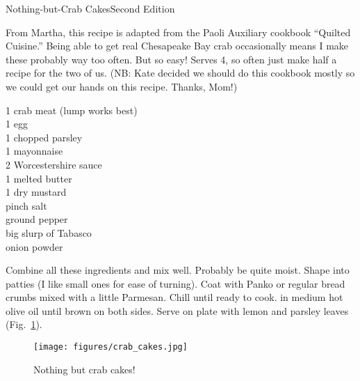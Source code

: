 \begin{entry}{Nothing-but-Crab Cakes}{Second Edition}

\begin{open}
  From Martha, this recipe is adapted from the Paoli Auxiliary cookbook
  ``Quilted Cuisine.'' Being able to get real Chesapeake Bay crab occasionally
  means I make these probably way too often. But so easy! Serves 4, so often
  just make half a recipe for the two of us. (NB: Kate decided we should do
  this cookbook mostly so we could get our hands on this recipe. Thanks,
  Mom!)
\end{open}
\begin{ingredients}
  \SI{1}{\pound} crab meat (lump works best)\\
  1 egg\\
  \SI{1}{\tblspoon} chopped parsley\\
  \SI{1}{\tblspoon} mayonnaise\\
  \SI{2}{\teaspoon} Worcestershire sauce\\
  \SI{1}{\tblspoon} melted butter\\
  \SI{1}{\teaspoon} dry mustard \\
  pinch salt\\
  ground pepper\\
  big slurp of Tabasco\\
  onion powder
\end{ingredients}
Combine all these ingredients and mix well. Probably be quite moist. Shape
into patties (I like small ones for ease of turning). Coat with Panko or
regular bread crumbs mixed with a little Parmesan. Chill until ready to
cook. \Saute in medium hot olive oil until brown on both sides.  Serve on plate with lemon and parsley leaves (Fig.~\ref{fig:crab-cakes}).
\begin{figure}[h]
    \centering
    \texttt{[image: figures/crab\_cakes.jpg]}
    \caption{Nothing but crab cakes!}
    \label{fig:crab-cakes}
\end{figure}
\end{entry}


